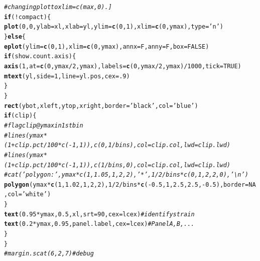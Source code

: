 \documentclass{article}\usepackage[]{graphicx}\usepackage[]{color}
\makeatletter
\newcommand{\hlnum}[1]{\textcolor[rgb]{0.686,0.059,0.569}{#1}}%
\newcommand{\hlstr}[1]{\textcolor[rgb]{0.192,0.494,0.8}{#1}}%
\newcommand{\hlcom}[1]{\textcolor[rgb]{0.678,0.584,0.686}{\textit{#1}}}%
\newcommand{\hlopt}[1]{\textcolor[rgb]{0,0,0}{#1}}%
\newcommand{\hlstd}[1]{\textcolor[rgb]{0.345,0.345,0.345}{#1}}%
\newcommand{\hlkwa}[1]{\textcolor[rgb]{0.161,0.373,0.58}{\textbf{#1}}}%
\newcommand{\hlkwc}[1]{\textcolor[rgb]{0.333,0.667,0.333}{#1}}%
\newcommand{\hlkwd}[1]{\textcolor[rgb]{0.737,0.353,0.396}{\textbf{#1}}}%
\newenvironment{kframe}{%
 \def\at@end@of@kframe{}%
 \ifinner\ifhmode%
  \def\at@end@of@kframe{\end{minipage}}%
  \begin{minipage}{\columnwidth}%
 \fi\fi%
 \def\FrameCommand##1{\hskip\@totalleftmargin \hskip-\fboxsep
 \colorbox{shadecolor}{##1}\hskip-\fboxsep
     \hskip-\linewidth \hskip-\@totalleftmargin \hskip\columnwidth}%
 \MakeFramed {\advance\hsize-\width
   \@totalleftmargin\z@ \linewidth\hsize
   \@setminipage}}%
 {\par\unskip\endMakeFramed%
 \at@end@of@kframe}
\newenvironment{knitrout}{}{} %
\makeatother
\begin{document}
\begin{knitrout}
\begin{kframe}
\begin{alltt}
    \hlcom{# changing plot to xlim=c(max,0).]}
    \hlkwa{if}\hlstd{(}\hlopt{!}\hlstd{compact)\{}
      \hlkwd{plot}\hlstd{(}\hlnum{0}\hlstd{,}\hlnum{0}\hlstd{,} \hlkwc{ylab}\hlstd{=xl,} \hlkwc{xlab}\hlstd{=yl,} \hlkwc{ylim}\hlstd{=}\hlkwd{c}\hlstd{(}\hlnum{0}\hlstd{,}\hlnum{1}\hlstd{),} \hlkwc{xlim}\hlstd{=}\hlkwd{c}\hlstd{(}\hlnum{0}\hlstd{,ymax),} \hlkwc{type}\hlstd{=}\hlstr{'n'}\hlstd{)}
    \hlstd{\}} \hlkwa{else}\hlstd{\{}
      \hlkwd{eplot}\hlstd{(}\hlkwc{ylim}\hlstd{=}\hlkwd{c}\hlstd{(}\hlnum{0}\hlstd{,}\hlnum{1}\hlstd{),} \hlkwc{xlim}\hlstd{=}\hlkwd{c}\hlstd{(}\hlnum{0}\hlstd{,ymax),} \hlkwc{annx}\hlstd{=F,} \hlkwc{anny}\hlstd{=F,} \hlkwc{box}\hlstd{=}\hlnum{FALSE}\hlstd{)}
      \hlkwa{if}\hlstd{(show.count.axis)\{}
        \hlkwd{axis}\hlstd{(}\hlnum{1}\hlstd{,} \hlkwc{at}\hlstd{=}\hlkwd{c}\hlstd{(}\hlnum{0}\hlstd{,ymax}\hlopt{/}\hlnum{2}\hlstd{,ymax),} \hlkwc{labels}\hlstd{=}\hlkwd{c}\hlstd{(}\hlnum{0}\hlstd{,ymax}\hlopt{/}\hlnum{2}\hlstd{,ymax)}\hlopt{/}\hlnum{1000}\hlstd{,} \hlkwc{tick}\hlstd{=}\hlnum{TRUE}\hlstd{)}
        \hlkwd{mtext}\hlstd{(yl,} \hlkwc{side}\hlstd{=}\hlnum{1}\hlstd{,} \hlkwc{line}\hlstd{=yl.pos,} \hlkwc{cex}\hlstd{=}\hlnum{.9}\hlstd{)}
      \hlstd{\}}
    \hlstd{\}}
    \hlkwd{rect}\hlstd{(ybot,xleft,ytop,xright,}\hlkwc{border}\hlstd{=}\hlstr{'black'}\hlstd{,}\hlkwc{col}\hlstd{=}\hlstr{'blue'}\hlstd{)}
    \hlkwa{if}\hlstd{(clip)\{}
      \hlcom{# flag clip @ ymax in 1st bin}
      \hlcom{#lines(ymax*(1+clip.pct/100*c(-1,1)), c(0,1/bins), col=clip.col, lwd=clip.lwd) }
      \hlcom{#lines(ymax*(1+clip.pct/100*c(-1,1)), c(1/bins,0), col=clip.col, lwd=clip.lwd) }
      \hlcom{#cat('polygon:',ymax*c(1,1.05,1,2,2),'*', 1/2/bins*c(0,1,2,2,0),'\textbackslash{}n')}
      \hlkwd{polygon}\hlstd{(ymax}\hlopt{*}\hlkwd{c}\hlstd{(}\hlnum{1}\hlstd{,}\hlnum{1.02}\hlstd{,}\hlnum{1}\hlstd{,}\hlnum{2}\hlstd{,}\hlnum{2}\hlstd{),} \hlnum{1}\hlopt{/}\hlnum{2}\hlopt{/}\hlstd{bins}\hlopt{*}\hlkwd{c}\hlstd{(}\hlopt{-}\hlnum{0.5}\hlstd{,}\hlnum{1}\hlstd{,}\hlnum{2.5}\hlstd{,}\hlnum{2.5}\hlstd{,}\hlopt{-}\hlnum{0.5}\hlstd{),} \hlkwc{border}\hlstd{=}\hlnum{NA}\hlstd{,} \hlkwc{col}\hlstd{=}\hlstr{'white'}\hlstd{)}
    \hlstd{\}}
    \hlkwd{text}\hlstd{(}\hlnum{0.95}\hlopt{*}\hlstd{ymax,} \hlnum{0.5}\hlstd{, xl,} \hlkwc{srt}\hlstd{=}\hlnum{90}\hlstd{,} \hlkwc{cex}\hlstd{=lcex)}    \hlcom{# identify strain}
    \hlkwd{text}\hlstd{(}\hlnum{0.2}\hlopt{*}\hlstd{ymax,} \hlnum{0.95}\hlstd{, panel.label,} \hlkwc{cex}\hlstd{=lcex)}   \hlcom{# Panel A, B, ...}
  \hlstd{\}}
\hlstd{\}}
\hlcom{# margin.scat(6,2,7) #debug}
\end{alltt}
\end{kframe}
\end{knitrout}
\end{document}
